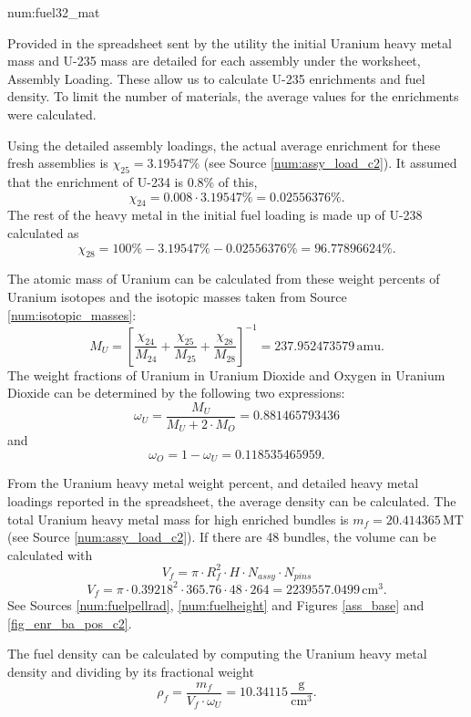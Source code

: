 \begin{numitem}{num:fuel32_mat}
  
   Provided in the spreadsheet sent by the utility the initial Uranium heavy metal mass and U-235 mass are detailed for each assembly under the worksheet, Assembly Loading. These allow us to calculate U-235 enrichments and fuel density. To limit the number of materials, the average values for the enrichments were calculated. 
   
   Using the detailed assembly loadings, the actual average enrichment for these fresh assemblies is $\chi_{25} = 3.19547\%$ (see Source \ref{num:assy_load_c2}). It assumed that the enrichment of U-234 is 0.8\% of this,
\[
    \chi_{24} = 0.008\cdot 3.19547\% = 0.02556376\%.
\]
    The rest of the heavy metal in the initial fuel loading is made up of U-238 calculated as
\[
    \chi_{28} = 100\% - 3.19547\% - 0.02556376\% = 96.77896624\%.
\]

The atomic mass of Uranium can be calculated from these weight percents of Uranium isotopes and the isotopic masses taken from Source \ref{num:isotopic_masses}:
\[
    M_U = \left[ \frac{\chi_{24}}{M_{24}} + \frac{\chi_{25}}{M_{25}} + \frac{\chi_{28}}{M_{28}} \right ]^{-1} = 237.952473579\,\mathrm{amu}. 
\]
The weight fractions of Uranium in Uranium Dioxide and Oxygen in Uranium Dioxide can be determined by the following two expressions:
\[
    \omega_{U} = \frac{M_U}{M_U + 2\cdot M_O} = 0.881465793436
\]
and
\[
    \omega_{O} = 1 - \omega_{U} = 0.118535465959.
\]

From the Uranium heavy metal weight percent, and detailed heavy metal loadings reported in the spreadsheet, the average density can be calculated. The total Uranium heavy metal mass for high enriched bundles is $m_f = 20.414365\,\mathrm{MT}$ (see Source \ref{num:assy_load_c2}).  If there are 48 bundles, the volume can be calculated with
\[
    V_f = \pi \cdot R_f^2 \cdot H \cdot N_{assy} \cdot N_{pins}
\]
\[
    V_f = \pi \cdot 0.39218^2 \cdot 365.76 \cdot 48 \cdot 264 = 2239557.0499\,\mathrm{cm^3}.
\]
See Sources \ref{num:fuelpellrad}, \ref{num:fuelheight} and Figures \ref{ass_base} and \ref{fig_enr_ba_pos_c2}.

The fuel density can be calculated by computing the Uranium heavy metal density and dividing by its fractional weight
\[
    \rho_f = \frac{m_f}{V_f\cdot\omega_{U}} = 10.34115\,\mathrm{\frac{g}{cm^3}}.
\]


\end{numitem}
